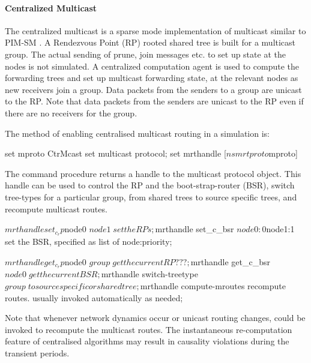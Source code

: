 \paragraph{Centralized Multicast}
The centralized multicast is a sparse mode implementation of multicast
similar to PIM-SM \cite{Deer94a:Architecture}.
A Rendezvous Point (RP) rooted shared tree is built
for a multicast group.  The actual sending of prune, join messages
etc. to set up state at the nodes is not simulated.  A centralized
computation agent is used to compute the forwarding trees and set up
multicast forwarding state,  at the relevant nodes as new
receivers join a group.  Data packets from the senders to a group are
unicast to the RP.  Note that data packets from the senders are
unicast to the RP even if there are no receivers for the group.

The method of enabling centralised multicast routing in a simulation is:
\begin{program}
        set mproto CtrMcast    \; set multicast protocol;
        set mrthandle [$ns mrtproto $mproto] 
\end{program}
The command procedure 
returns a handle to the multicast protocol object.
This handle can be used to control the RP and the boot-strap-router (BSR),
switch tree-types for a particular group,
from shared trees to source specific trees, and
recompute multicast routes.
\begin{program}
        $mrthandle set_c_rp $node0 $node1          \; set the RPs;
        $mrthandle set_c_bsr $node0:0 $node1:1     \; set the BSR, specified as list of node:priority;

        $mrthandle get_c_rp $node0 $group          \; get the current RP ???;
        $mrthandle get_c_bsr $node0                \; get the current BSR;

        $mrthandle switch-treetype $group         \; to source specific or shared tree;

        $mrthandle compute-mroutes       \; recompute routes. usually invoked automatically as needed;
\end{program}

Note that whenever network dynamics occur or unicast routing changes,
 could be invoked to recompute the multicast routes.
The instantaneous re-computation feature of centralised algorithms
may result in causality violations during the transient
periods.

